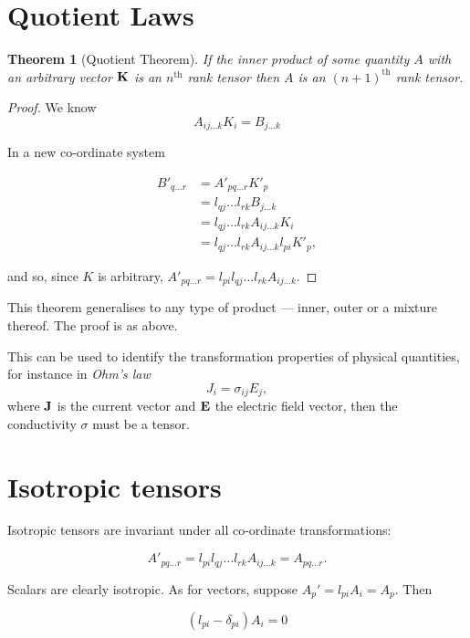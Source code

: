 \documentclass{notes}
\theoremstyle{plain}
\newtheorem{theorem}{Theorem}[chapter]
\begin{document}
\section{Quotient Laws}

\begin{theorem}[Quotient Theorem]
  If the inner product of some quantity $A$ with an arbitrary vector
  $\mathbf{K}$ is an $n^{\text{th}}$ rank tensor then $A$ is an
  $(n+1)^{\text{th}}$ rank tensor.
\end{theorem}

\begin{proof}

We know
\[
A_{ij \dots k} K_i = B_{j \dots k}
\]

In a new co-ordinate system

\begin{align*}
B'_{q \dots r} &= A'_{pq \dots r} K'_p \\
               &= l_{q j} \dots l_{r k} B_{j \dots k} \\
               &= l_{q j} \dots l_{r k} A_{ij \dots k} K_i \\
               &= l_{q j} \dots l_{r k} A_{ij \dots k} l_{pi} K'_{p},
\end{align*}

and so, since $K$ is arbitrary, $A'_{pq \dots r} = l_{pi} l_{q j}
\dots l_{r k} A_{ij \dots k}$.
\end{proof}

This theorem generalises to any type of product --- inner, outer or a
mixture thereof.  The proof is as above.

This can be used to identify the transformation properties of physical
quantities, for instance in \emph{Ohm's law}
\[
J_i = \sigma_{ij} E_j,
\]
where $\mathbf{J}$ is the current vector and $\mathbf{E}$ the electric
field vector, then the conductivity $\sigma$ must be a tensor.

\section{Isotropic tensors}

Isotropic tensors are invariant under all co-ordinate transformations:

\[
A'_{p q \dots r} = l_{pi} l_{qj} \dots l_{rk} A_{ij \dots k} = A_{p q
  \dots r}.
\]

Scalars are clearly isotropic.  As for vectors, suppose $A_p' = l_{pi}
A_i = A_p$.  Then

\[
(l_{pi} - \delta_{pi}) A_i = 0
\]
\end{document}
